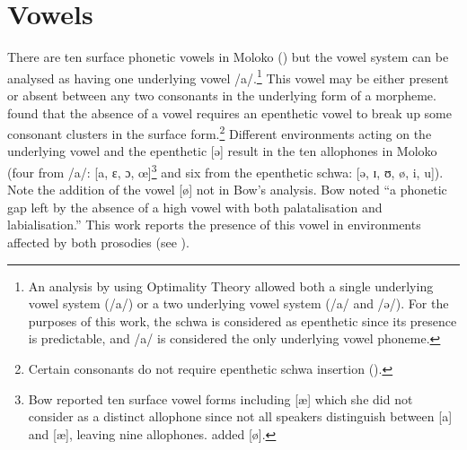 \section{Vowels}\label{sec:2.3}
\hypertarget{RefHeading1210541525720847}{}
\largerpage
There are ten surface phonetic vowels in Moloko () but the vowel system can be analysed as having one underlying vowel /a/.\footnote{An analysis by \citet{Bow1999} using Optimality Theory allowed both a single underlying vowel system (/a/) or a two underlying vowel system (/a/ and /ə/).  For the purposes of this work, the schwa is considered as epenthetic since its presence is predictable, and /a/ is considered the only underlying vowel phoneme.}  This vowel may be either present or absent between any two consonants in the underlying form of a morpheme. \citet{Bow1997c} found that the absence of a vowel requires an epenthetic vowel to break up some consonant clusters in the surface form.\footnote{Certain consonants do not require epenthetic schwa insertion ().} Different environments acting on the underlying vowel and the epenthetic [ə] result in the ten allophones in Moloko (four from /a/: [a, ɛ, ɔ, œ]\footnote{Bow reported ten surface vowel forms including [æ] which she did not consider as a distinct allophone since not all speakers distinguish between [a] and [æ], leaving nine allophones. \citet{Friesen2001} added [ø].} and six from the epenthetic schwa: [ə, ɪ, ʊ, ø, i, u]).  Note the addition of the vowel [ø] not in Bow’s analysis. Bow noted “a phonetic gap left by the absence of a high vowel with both palatalisation and labialisation.” This work reports the presence of this vowel in environments affected by both prosodies (see ). 

